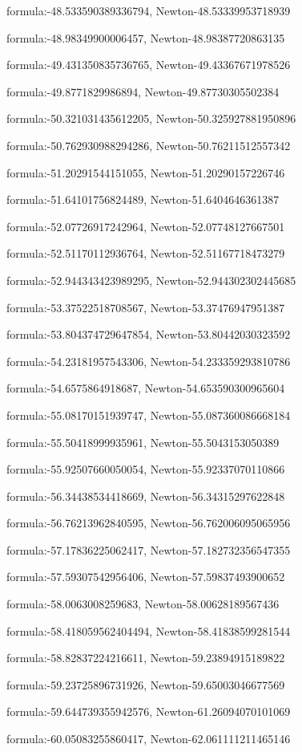 \documentclass{article}
\begin{document}
formula:-48.533590389336794, Newton-48.53339953718939

formula:-48.98349900006457, Newton-48.98387720863135

formula:-49.431350835736765, Newton-49.43367671978526

formula:-49.8771829986894, Newton-49.87730305502384

formula:-50.321031435612205, Newton-50.325927881950896

formula:-50.762930988294286, Newton-50.76211512557342

formula:-51.20291544151055, Newton-51.20290157226746

formula:-51.64101756824489, Newton-51.6404646361387

formula:-52.07726917242964, Newton-52.07748127667501

formula:-52.51170112936764, Newton-52.51167718473279

formula:-52.944343423989295, Newton-52.944302302445685

formula:-53.37522518708567, Newton-53.37476947951387

formula:-53.804374729647854, Newton-53.80442030323592

formula:-54.23181957543306, Newton-54.233359293810786

formula:-54.6575864918687, Newton-54.653590300965604

formula:-55.08170151939747, Newton-55.087360086668184

formula:-55.50418999935961, Newton-55.5043153050389

formula:-55.92507660050054, Newton-55.92337070110866

formula:-56.34438534418669, Newton-56.34315297622848

formula:-56.76213962840595, Newton-56.762006095065956

formula:-57.17836225062417, Newton-57.182732356547355

formula:-57.59307542956406, Newton-57.59837493900652

formula:-58.0063008259683, Newton-58.00628189567436

formula:-58.418059562404494, Newton-58.41838599281544

formula:-58.82837224216611, Newton-59.23894915189822

formula:-59.23725896731926, Newton-59.65003046677569

formula:-59.644739355942576, Newton-61.26094070101069

formula:-60.05083255860417, Newton-62.061111211465146
\end{document}
